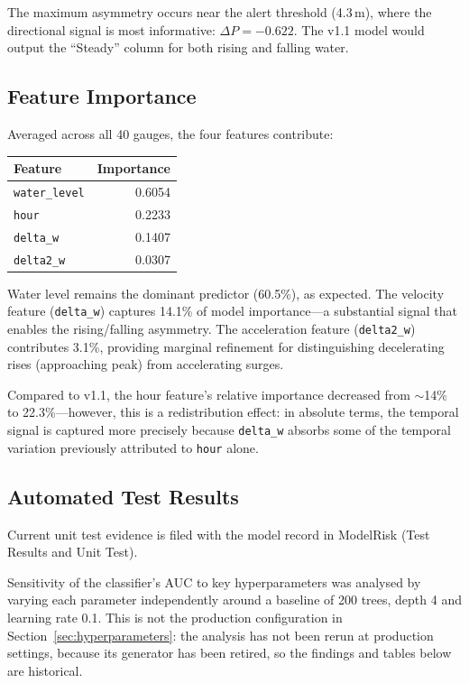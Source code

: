 \documentclass[11pt,a4paper]{article}
\begin{document}
The maximum asymmetry occurs near the alert threshold (4.3\,m), where the directional
signal is most informative: $\Delta P = -0.622$. The v1.1 model would output the
``Steady'' column for both rising and falling water.

\subsection{Feature Importance}
Averaged across all 40 gauges, the four features contribute:

\begin{center}
\begin{tabular}{lr}
\toprule
\textbf{Feature} & \textbf{Importance} \\
\midrule
\texttt{water\_level} & 0.6054 \\
\texttt{hour} & 0.2233 \\
\texttt{delta\_w} & 0.1407 \\
\texttt{delta2\_w} & 0.0307 \\
\bottomrule
\end{tabular}
\end{center}

\noindent Water level remains the dominant predictor (60.5\%), as expected.
The velocity feature (\texttt{delta\_w}) captures 14.1\% of model importance---a
substantial signal that enables the rising/falling asymmetry. The acceleration
feature (\texttt{delta2\_w}) contributes 3.1\%, providing marginal refinement
for distinguishing decelerating rises (approaching peak) from accelerating surges.

\noindent Compared to v1.1, the hour feature's relative importance decreased from
$\sim$14\% to 22.3\%---however, this is a redistribution effect: in absolute terms,
the temporal signal is captured more precisely because \texttt{delta\_w} absorbs
some of the temporal variation previously attributed to \texttt{hour} alone.

\subsection{Automated Test Results}
Current unit test evidence is filed with the model record in ModelRisk (Test Results and Unit Test).

\mkmsensitivity

Sensitivity of the classifier's AUC to key hyperparameters was analysed by varying
each parameter independently around a baseline of 200 trees, depth 4 and learning
rate 0.1.  This is not the production configuration in Section~\ref{sec:hyperparameters}:
the analysis has not been rerun at production settings, because its generator has
been retired, so the findings and tables below are historical.
\end{document}
